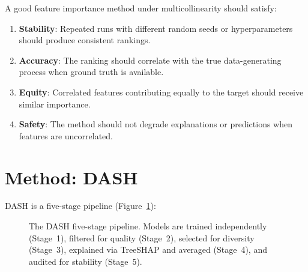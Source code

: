 \documentclass[11pt]{article}
\newcommand{\dash}{\textsc{DASH}}
\begin{document}
A good feature importance method under multicollinearity should satisfy:
\begin{enumerate}
  \item \textbf{Stability}: Repeated runs with different random seeds or
    hyperparameters should produce consistent rankings.
  \item \textbf{Accuracy}: The ranking should correlate with the true
    data-generating process when ground truth is available.
  \item \textbf{Equity}: Correlated features contributing equally to the
    target should receive similar importance.
  \item \textbf{Safety}: The method should not degrade explanations or
    predictions when features are uncorrelated.
\end{enumerate}


\section{Method: DASH}
\label{sec:method}

\dash{} is a five-stage pipeline (Figure~\ref{fig:pipeline}):

\begin{figure}[h]
\centering
{}
\caption{The \dash{} five-stage pipeline. Models are trained independently
(Stage~1), filtered for quality (Stage~2), selected for diversity (Stage~3),
explained via TreeSHAP and averaged (Stage~4), and audited for stability
(Stage~5).}
\label{fig:pipeline}
\end{figure}
\end{document}
